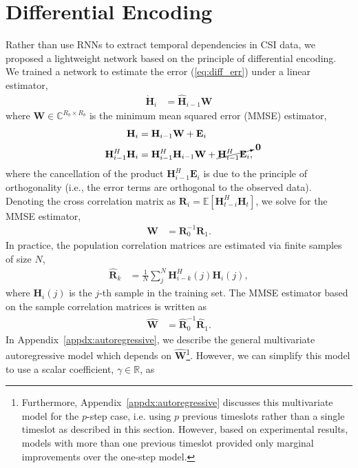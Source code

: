 \section{Differential Encoding} \label{sect:diff-enc}

Rather than use RNNs to extract temporal dependencies in CSI data, we proposed a lightweight network based on the principle of differential encoding. We trained a network to estimate the error (\ref{eq:diff_err}) under a linear estimator, 
\begin{align*}
	\grave{\mathbf H}_i &=  \hat{\mathbf H}_{i-1} \mathbf W
\end{align*}
where $\mathbf W \in \mathbb C^{R_b \times R_b}$ is the minimum mean squared error (MMSE) estimator,
\begin{align*}
	\mathbf H_i &= \mathbf H_{i-1}\mathbf W + \mathbf E_i \\
	\mathbf H_{i-1}^H\mathbf H_i &= \mathbf H_{i-1}^H\mathbf H_{i-1} \mathbf W + \cancelto{\mathbf 0}{\mathbf H_{i-1}^H\mathbf E_i},
\end{align*}
where the cancellation of the product $\mathbf H_{i-1}^H\mathbf E_i$ is due to the principle of orthogonality (i.e., the error terms are orthogonal to the observed data). Denoting the cross correlation matrix as $\mathbf R_{i} = \mathbb{E}\left[\mathbf H_{t-i}^H\mathbf H_{t}\right]$, we solve for the MMSE estimator,
\begin{align*}
	\mathbf W &= \mathbf R_0^{-1} \mathbf R_1.
\end{align*}
In practice, the population correlation matrices are estimated
via finite samples of size $N$,
\begin{align*}
	\mathbf{\hat R}_k &= \frac 1N \sum_{j}^N \mathbf H_{i-k}^H(j)\mathbf H_{i}(j),
\end{align*}
where $\mathbf H_i(j)$ is the $j$-th sample in the training set.
The MMSE estimator based on the sample correlation matrices is written as
\begin{align*}
	\hat{\mathbf W} &= \hat{\mathbf R}_0^{-1} \hat{\mathbf R}_1.
\end{align*}
In Appendix~\ref{appdx:autoregressive}, we describe the general multivariate autoregressive model which depends on $\hat{\mathbf{W}}$\footnote{Furthermore, Appendix~\ref{appdx:autoregressive} discusses this multivariate model for the $p$-step case, i.e. using $p$ previous timeslots rather than a single timeslot as described in this section. However, based on experimental results, models with more than one previous timeslot provided only marginal improvements over the one-step model.}. However, we can simplify this model to use a scalar coefficient, $\gamma \in \mathbb R$, as
